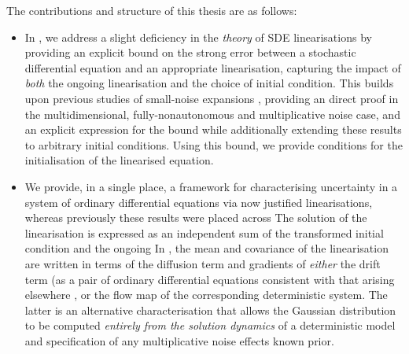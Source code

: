 The contributions and structure of this thesis are as follows:
\begin{itemize}
	\item In , we address a slight deficiency in the \emph{theory} of SDE linearisations by providing an explicit bound on the strong error between a stochastic differential equation and an appropriate linearisation, capturing the impact of \emph{both} the ongoing linearisation and the choice of initial condition.
	      This builds upon previous studies of small-noise expansions \cite[e.g.]{Sanz-AlonsoStuart_2017_GaussianApproximationsSmall,Blagoveshchenskii_1962_DiffusionProcessesDepending,FreidlinWentzell_1998_RandomPerturbationsDynamical}, providing an direct proof in the multidimensional, fully-nonautonomous and multiplicative noise case, and an explicit expression for the bound while additionally extending these results to arbitrary initial conditions.
	      Using this bound, we provide conditions for the initialisation of the linearised equation.



	\item We provide, in a single place, a framework for characterising uncertainty in a system of ordinary differential equations via now justified linearisations, whereas previously these results were placed across 
	      The solution of the linearisation is expressed as an independent sum of the transformed initial condition and the ongoing
	      In , the mean and covariance of the linearisation are written in terms of the diffusion term and gradients of \emph{either} the drift term (as a pair of ordinary differential equations consistent with that arising elsewhere \cite[e.g.]{Jazwinski_2014_StochasticProcessesFiltering, Sanz-AlonsoStuart_2017_GaussianApproximationsSmall, SarkkaSolin_2019_AppliedStochasticDifferential, ArchambeauEtAl_2007_GaussianProcessApproximations}, or the flow map of the corresponding deterministic system.
	      The latter is an alternative characterisation that allows the Gaussian distribution to be computed \emph{entirely from the solution dynamics} of a deterministic model and specification of any multiplicative noise effects known prior.


\end{itemize}
